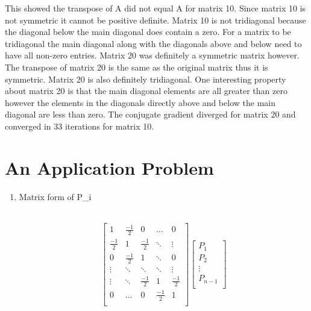 \documentclass[letterpaper,12pt]{article}
\begin{document}
\begin{enumerate}
\begin{enumerate}
This showed the transpose of A did not equal A for matrix 10. Since matrix 10 is not symmetric it cannot be positive definite. Matrix 10 is not tridiagonal because the diagonal below the main diagonal does contain a zero. For a matrix to be tridiagonal the main diagonal along with the diagonals above and below need to have all non-zero entries. Matrix 20 was definitely a symmetric matrix however. The transpose of matrix 20 is the same as the original matrix thus it is symmetric. Matrix 20 is also definitely tridiagonal. One interesting property about matrix 20 is that the main diagonal elements are all greater than zero however the elements in the diagonals directly above and below the main diagonal are less than zero. The conjugate gradient diverged for matrix 20 and converged in 33 iterations for matrix 10. 


\end{enumerate}
















\section{An Application Problem}
\begin{enumerate}

\item Matrix form of P_{i}

\\\[ \begin{bmatrix}
1 & \frac{-1}{2} & 0 & \hdots & 0\\
\frac{-1}{2} & 1 & \frac{-1}{2} & \ddots & \vdots\\
0 & \frac{-1}{2} & 1 & \ddots & 0\\
\vdots & \ddots & \ddots & \ddots & \vdots\\
\vdots & \ddots & \frac{-1}{2} & 1 & \frac{-1}{2} \\
0 & \hdots & 0 & \frac{-1}{2} & 1 \\

\end{bmatrix}
\begin{bmatrix}
P_{1}\\
P_{2}\\
\vdots\\
P_{n-1}\\


\end{bmatrix}\]
\end{enumerate}
\end{enumerate}
\end{document}

